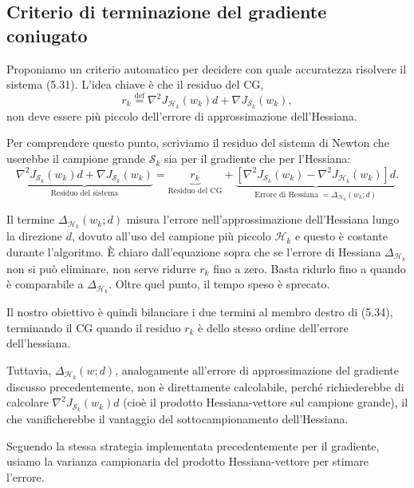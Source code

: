 \documentclass[italian, a4paper, twoside, binding=6mm]{sapthesis}
\begin{document}
\subsection{Criterio di terminazione del gradiente coniugato}

Proponiamo un criterio automatico per decidere con quale accuratezza risolvere il sistema (5.31). L'idea chiave è che il residuo del CG,
\[
r_k \stackrel{\mathrm{def}}{=} \nabla^2 J_{\mathcal{H}_k}(w_k) d + \nabla J_{\mathcal{S}_k}(w_k), \tag{5.33}
\]
non deve essere più piccolo dell'errore di approssimazione dell'Hessiana.

Per comprendere questo punto, scriviamo il residuo del sistema di Newton che userebbe il campione grande \(\mathcal{S}_k\) sia per il gradiente che per l'Hessiana:
\[
\underbrace{\nabla^2 J_{\mathcal{S}_k}(w_k) d + \nabla J_{\mathcal{S}_k}(w_k)}_{\text{Residuo del sistema}}
= \underbrace{r_k}_{\text{Residuo del CG}} + \underbrace{\left[\nabla^2 J_{\mathcal{S}_k}(w_k) - \nabla^2 J_{\mathcal{H}_k}(w_k)\right] d}_{\text{Errore di Hessiana }= \Delta_{\mathcal{H}_k}(w_k; d)}. \tag{5.34}
\]

Il termine \(\Delta_{\mathcal{H}_k}(w_k; d)\) misura l'errore nell'approssimazione dell'Hessiana lungo la direzione \(d\), dovuto all'uso del campione più piccolo \(\mathcal{H}_k\) e questo è costante durante l'algoritmo. È chiaro dall'equazione sopra che se l'errore di Hessiana \(\Delta_{\mathcal{H}_k}\) non si può eliminare, non serve ridurre \(r_k\) fino a zero. Basta ridurlo fino a quando è comparabile a \(\Delta_{\mathcal{H}_k}\). Oltre quel punto, il tempo speso è sprecato.

Il nostro obiettivo è quindi bilanciare i due termini al membro destro di (5.34), terminando il CG quando il residuo \(r_k\) è dello stesso ordine dell'errore dell'hessiana.

Tuttavia, \(\Delta_{\mathcal{H}_k}(w; d)\), analogamente all'errore di approssimazione del gradiente discusso precedentemente, non è direttamente calcolabile, perché richiederebbe di calcolare \(\nabla^2 J_{\mathcal{S}_k}(w_k)d\) (cioè il prodotto Hessiana-vettore sul campione grande), il che vanificherebbe il vantaggio del sottocampionamento dell'Hessiana.

Seguendo la stessa strategia implementata precedentemente per il gradiente, usiamo la varianza campionaria del prodotto Hessiana-vettore per stimare l'errore. 
\end{document}
